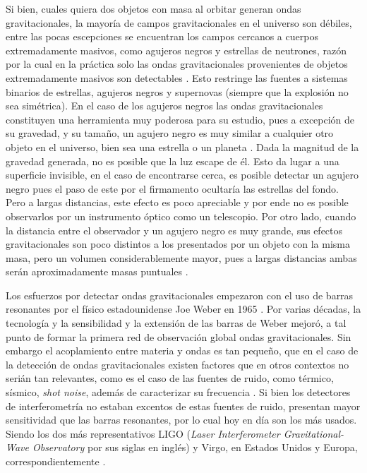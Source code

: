 	Si bien, cuales quiera dos objetos con masa al orbitar generan ondas gravitacionales, la mayor\'ia de campos gravitacionales en el universo son d\'ebiles, entre las pocas escepciones se encuentran los campos cercanos a cuerpos extremadamente masivos, como agujeros negros y estrellas de neutrones, raz\'on por la cual	en la pr\'actica solo las ondas gravitacionales provenientes de objetos extremadamente masivos son detectables \cite{straumann2012general}. Esto restringe las fuentes a sistemas binarios de estrellas, agujeros negros y supernovas (siempre que la explosi\'on no sea sim\'etrica). En el caso de los agujeros negros las ondas gravitacionales constituyen una herramienta muy poderosa para su estudio, pues a excepción de su gravedad, y su tamaño, un agujero negro es muy similar a cualquier otro objeto en el universo, bien sea una estrella o un planeta \cite{meier2012black}. Dada la magnitud de la gravedad generada, no es posible que la luz escape de él. Esto da lugar a una superficie invisible, en el caso de encontrarse cerca, es posible detectar un agujero negro pues el paso de este por el firmamento ocultar\'ia las estrellas del fondo. Pero a largas distancias, este efecto es poco apreciable y por ende no es posible observarlos por un instrumento \'optico como un telescopio. Por otro lado, cuando la distancia entre el observador y un agujero negro es muy grande, sus efectos gravitacionales son poco distintos a los presentados por un objeto con la misma masa, pero un volumen considerablemente mayor, pues a largas distancias ambas serán aproximadamente masas puntuales \cite{meier2012black}.
	
	Los esfuerzos por detectar ondas gravitacionales empezaron con el uso de barras resonantes por el f\'isico estadounidense Joe Weber en 1965 \cite{weber1967gravitational, bassan2014advanced}. Por varias d\'ecadas, la tecnolog\'ia y la sensibilidad y la extensi\'on de las barras de Weber mejor\'o, a tal punto de formar la primera red de observaci\'on global ondas gravitacionales. Sin embargo el acoplamiento entre materia y ondas es tan peque\~no, que en el caso de la detecci\'on de ondas gravitacionales existen factores que en otros contextos no seri\'an tan relevantes, como es el caso de las fuentes de ruido, como t\'ermico, s\'ismico, \textit{shot noise}, adem\'as de caracterizar su frecuencia \cite{bassan2014advanced}. Si bien los detectores de interferometr\'ia no estaban excentos de estas fuentes de ruido, presentan mayor sensitividad que las barras resonantes, por lo cual hoy en d\'ia son los m\'as usados. Siendo los dos m\'as representativos LIGO (\textit{Laser Interferometer Gravitational-Wave Observatory} por sus siglas en ingl\'es) y Virgo, en Estados Unidos y Europa, correspondientemente \cite{abbott2009ligo, acernese2008status, bassan2014advanced}.
	
